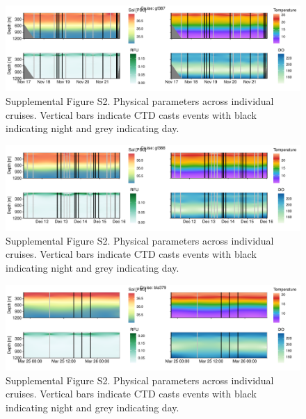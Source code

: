 \documentclass[
]{article}
\begin{document}
\begin{figure}

{\centering \includegraphics[width=1\textwidth,height=\textheight]{index_files/figure-pdf/unnamed-chunk-19-17.pdf}

}

\caption{Supplemental Figure S2. Physical parameters across individual
cruises. Vertical bars indicate CTD casts events with black indicating
night and grey indicating day.}

\end{figure}

\begin{figure}

{\centering \includegraphics[width=1\textwidth,height=\textheight]{index_files/figure-pdf/unnamed-chunk-19-18.pdf}

}

\caption{Supplemental Figure S2. Physical parameters across individual
cruises. Vertical bars indicate CTD casts events with black indicating
night and grey indicating day.}

\end{figure}

\begin{figure}

{\centering \includegraphics[width=1\textwidth,height=\textheight]{index_files/figure-pdf/unnamed-chunk-19-19.pdf}

}

\caption{Supplemental Figure S2. Physical parameters across individual
cruises. Vertical bars indicate CTD casts events with black indicating
night and grey indicating day.}

\end{figure}
\end{document}
